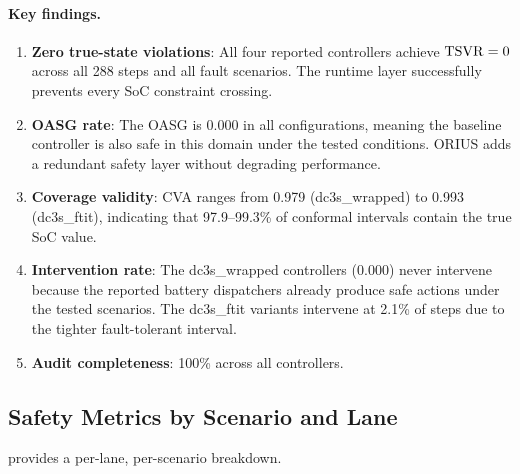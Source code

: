 \paragraph{Key findings.}
\begin{enumerate}[nosep]
  \item \textbf{Zero true-state violations}: All four reported controllers achieve
        $\mathrm{TSVR} = 0$ across all 288 steps and all fault scenarios.  The runtime
        layer successfully prevents every SoC constraint crossing.
  \item \textbf{OASG rate}: The OASG is 0.000 in all configurations, meaning the
        baseline controller is also safe in this domain under the tested conditions.
        ORIUS adds a redundant safety layer without degrading performance.
  \item \textbf{Coverage validity}: CVA ranges from 0.979 (dc3s\_wrapped) to
        0.993 (dc3s\_ftit), indicating that 97.9--99.3\% of conformal intervals
        contain the true SoC value.
  \item \textbf{Intervention rate}: The dc3s\_wrapped controllers (0.000) never
        intervene because the reported battery dispatchers already produce
        safe actions under the tested scenarios.  The dc3s\_ftit variants intervene
        at 2.1\% of steps due to the tighter fault-tolerant interval.
  \item \textbf{Audit completeness}: 100\% across all controllers.
\end{enumerate}

\subsection{Safety Metrics by Scenario and Lane}

 provides a per-lane, per-scenario breakdown.

